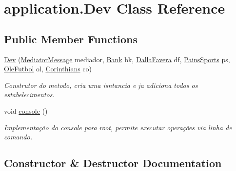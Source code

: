 \hypertarget{classapplication_1_1_dev}{}\section{application.\+Dev Class Reference}
\label{classapplication_1_1_dev}
\subsection*{Public Member Functions}
\begin{DoxyCompactItemize}
\item 
\mbox{\hyperlink{classapplication_1_1_dev_af40d1c4f6087ef270fff0a0296056a11}{Dev}} (\mbox{\hyperlink{classmediator_pattern_1_1_mediator_message}{Mediator\+Message}} mediador, \mbox{\hyperlink{classmediator_pattern_1_1_bank}{Bank}} bk, \mbox{\hyperlink{classmediator_pattern_1_1_dalla_favera}{Dalla\+Favera}} df, \mbox{\hyperlink{classmediator_pattern_1_1_pains_sports}{Pains\+Sports}} ps, \mbox{\hyperlink{classmediator_pattern_1_1_ole_futbol}{Ole\+Futbol}} ol, \mbox{\hyperlink{classmediator_pattern_1_1_corinthians}{Corinthians}} co)
\begin{DoxyCompactList}\small\item\em Construtor do metodo, cria uma isntancia e ja adiciona todos os estabelecimentos. \end{DoxyCompactList}\item 
void \mbox{\hyperlink{classapplication_1_1_dev_a4f38c49b73e7b9c02c7979d6f175eab0}{console}} ()
\begin{DoxyCompactList}\small\item\em Implementação do console para root, permite executar operações via linha de comando. \end{DoxyCompactList}\end{DoxyCompactItemize}


\subsection{Constructor \& Destructor Documentation}
\mbox{\label{classapplication_1_1_dev_af40d1c4f6087ef270fff0a0296056a11}} 
